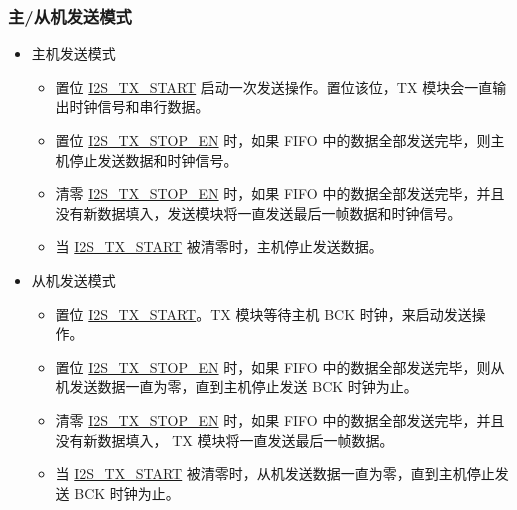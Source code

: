 \documentclass[main\_\_CN.tex]{subfiles}
\begin{document}
\subsubsection{主/从机发送模式} \label{sec:i2s-master-slave-tx-mode}
\begin{itemize}
    \item 主机发送模式
    \begin{itemize}
        \item 置位 \hyperref[fielddesc:I2STXSTART]{I2S\_TX\_START} 启动一次发送操作。置位该位，TX 模块会一直输出时钟信号和串行数据。
        \item 置位 \hyperref[fielddesc:I2STXSTOPEN]{I2S\_TX\_STOP\_EN} 时，如果 FIFO 中的数据全部发送完毕，则主机停止发送数据和时钟信号。
        \item 清零 \hyperref[fielddesc:I2STXSTOPEN]{I2S\_TX\_STOP\_EN} 时，如果 FIFO 中的数据全部发送完毕，并且没有新数据填入，发送模块将一直发送最后一帧数据和时钟信号。
        \item 当 \hyperref[fielddesc:I2STXSTART]{I2S\_TX\_START} 被清零时，主机停止发送数据。
    \end{itemize}
    \item 从机发送模式
     \begin{itemize}
        \item 置位 \hyperref[fielddesc:I2STXSTART]{I2S\_TX\_START}。TX 模块等待主机 BCK 时钟，来启动发送操作。
        \item 置位 \hyperref[fielddesc:I2STXSTOPEN]{I2S\_TX\_STOP\_EN} 时，如果 FIFO 中的数据全部发送完毕，则从机发送数据一直为零，直到主机停止发送 BCK 时钟为止。
        \item 清零 \hyperref[fielddesc:I2STXSTOPEN]{I2S\_TX\_STOP\_EN} 时，如果 FIFO 中的数据全部发送完毕，并且没有新数据填入， TX 模块将一直发送最后一帧数据。
        \item 当 \hyperref[fielddesc:I2STXSTART]{I2S\_TX\_START} 被清零时，从机发送数据一直为零，直到主机停止发送 BCK 时钟为止。
    \end{itemize}
\end{itemize}
\end{document}

